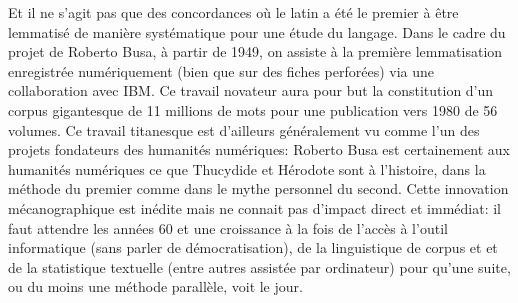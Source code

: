 Et il ne s'agit pas que des concordances où le latin a été le premier à être lemmatisé de manière systématique pour une étude du langage. Dans le cadre du projet de Roberto Busa, à partir de 1949, on assiste à la première lemmatisation enregistrée numériquement (bien que sur des fiches perforées) via une collaboration avec IBM. Ce travail novateur aura pour but la constitution d'un corpus gigantesque de 11 millions de mots pour une publication vers 1980 de 56 volumes. Ce travail titanesque est d'ailleurs généralement vu comme l'un des projets fondateurs des humanités numériques: Roberto Busa est certainement aux humanités numériques ce que Thucydide et Hérodote sont à l'histoire, dans la méthode du premier comme dans le mythe personnel du second. Cette innovation mécanographique est inédite mais ne connait pas d'impact direct et immédiat: il faut attendre les années 60 et une  croissance à la fois de l'accès à l'outil informatique (sans parler de démocratisation), de la linguistique de corpus et et de la statistique textuelle (entre autres assistée par ordinateur) pour qu'une suite, ou du moins une méthode parallèle, voit le jour. 

